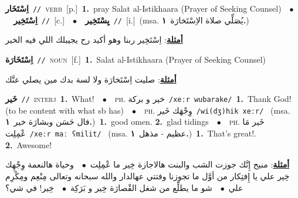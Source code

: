 \documentclass[10pt,a4paper,twoside]{article} %
\begin{document}
\begin{multicols}{2}
{\setlength\topsep{0pt}\textbf{\foreignlanguage{arabic}{اِسْتَخَار}}\ {\color{gray}\texttt{//}\color{black}}\ \textsc{verb}\ [p.]\ \textbf{1.}~pray Salat al-Istikhaara (Prayer of Seeking Counsel)\ \ $\bullet$\ \ \setlength\topsep{0pt}\textbf{\foreignlanguage{arabic}{اِسْتَخِير}}\ {\color{gray}\texttt{//}\color{black}}\ [c.]\ \ $\bullet$\ \ \setlength\topsep{0pt}\textbf{\foreignlanguage{arabic}{يِسْتَخِير}}\ {\color{gray}\texttt{//}\color{black}}\ [i.]\ \color{gray}(msa. \foreignlanguage{arabic}{يُصَلِّي صلاة الاِسْتَخارَة}~\foreignlanguage{arabic}{\textbf{١.}})\color{black}\  \begin{flushright}\color{gray}\foreignlanguage{arabic}{\textbf{\underline{\foreignlanguage{arabic}{أمثلة}}}: اِسْتَخِير ربنا وهو أكيد رح يجيبلك اللي فيه الخير}\end{flushright}\color{black}} \vspace{2mm}

{\setlength\topsep{0pt}\textbf{\foreignlanguage{arabic}{اِسْتَخَارَة}}\ {\color{gray}\texttt{//}\color{black}}\ \textsc{noun}\ [f.]\ \textbf{1.}~Salat al-Istikhaara (Prayer of Seeking Counsel)\  \begin{flushright}\color{gray}\foreignlanguage{arabic}{\textbf{\underline{\foreignlanguage{arabic}{أمثلة}}}: صليت اِسْتَخارَة ولا لسة بدك مين يصلي عنَّك}\end{flushright}\color{black}} \vspace{2mm}

{\setlength\topsep{0pt}\textbf{\foreignlanguage{arabic}{خَير}}\ {\color{gray}\texttt{//}\color{black}}\ \textsc{interj}\ \textbf{1.}~What!\ \ $\bullet$\ \ \textsc{ph.} \color{gray} \foreignlanguage{arabic}{خير و بركة}\color{black}\ {\color{gray}\texttt{/{\sffamily xeːr wubarake}/}\color{black}}\ \textbf{1.}~Thank God! (to be content with what sb has)\ \ $\bullet$\ \ \textsc{ph.} \color{gray} \foreignlanguage{arabic}{وِجْهَك خَير}\color{black}\ {\color{gray}\texttt{/{\sffamily wi(dʒ)hik xeːr}/}\color{black}}\ \color{gray} (msa. \foreignlanguage{arabic}{فال حَسَن وبشارَة خير}~\foreignlanguage{arabic}{\textbf{١.}})\color{black}\ \textbf{1.}~good omen.  \textbf{2.}~glad tidings\ \ $\bullet$\ \ \textsc{ph.} \color{gray} \foreignlanguage{arabic}{خَير مَا عْمِلِت}\color{black}\ {\color{gray}\texttt{/{\sffamily xeːr maː ʕmilit}/}\color{black}}\ \color{gray} (msa. \foreignlanguage{arabic}{عظيم - مذهل}~\foreignlanguage{arabic}{\textbf{١.}})\color{black}\ \textbf{1.}~That's great!.  \textbf{2.}~Awesome!\  \begin{flushright}\color{gray}\foreignlanguage{arabic}{\textbf{\underline{\foreignlanguage{arabic}{أمثلة}}}: منيح إِنَّك جوزت الشب والبنت هالاجازة خِير ما عْمِلِت\ $\bullet$\ \  وحياة هالنعمة وِجْهِك خِير علي يا إِفتِكار من أوَّل ما تجوزنا وفتتي عهالدار والله سبحانه وتعالى مِنْعِم ومِكْرِم علي\ $\bullet$\ \  شو ما يطلِّع من شغل القْصارَة خِير و بَرَكِة\ $\bullet$\ \  خِير! في شي؟}\end{flushright}\color{black}} \vspace{2mm}


\end{multicols}
\end{document}
